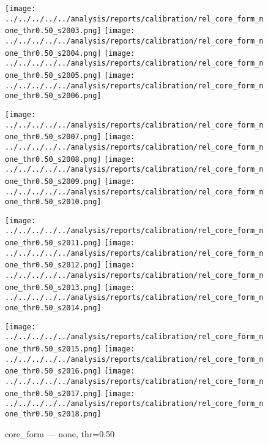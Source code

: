 \begin{figure}[t]
  \centering
  \begin{minipage}[t]{0.49\linewidth}
    \caption*{\footnotesize core_form — none, thr=0.50}
    \texttt{[image: ../../../../../analysis/reports/calibration/rel\_core\_form\_none\_thr0.50\_s2003.png]}
    \texttt{[image: ../../../../../analysis/reports/calibration/rel\_core\_form\_none\_thr0.50\_s2004.png]}
    \texttt{[image: ../../../../../analysis/reports/calibration/rel\_core\_form\_none\_thr0.50\_s2005.png]}
    \texttt{[image: ../../../../../analysis/reports/calibration/rel\_core\_form\_none\_thr0.50\_s2006.png]}
    \par\vspace{2pt}
    \texttt{[image: ../../../../../analysis/reports/calibration/rel\_core\_form\_none\_thr0.50\_s2007.png]}
    \texttt{[image: ../../../../../analysis/reports/calibration/rel\_core\_form\_none\_thr0.50\_s2008.png]}
    \texttt{[image: ../../../../../analysis/reports/calibration/rel\_core\_form\_none\_thr0.50\_s2009.png]}
    \texttt{[image: ../../../../../analysis/reports/calibration/rel\_core\_form\_none\_thr0.50\_s2010.png]}
    \par\vspace{2pt}
    \texttt{[image: ../../../../../analysis/reports/calibration/rel\_core\_form\_none\_thr0.50\_s2011.png]}
    \texttt{[image: ../../../../../analysis/reports/calibration/rel\_core\_form\_none\_thr0.50\_s2012.png]}
    \texttt{[image: ../../../../../analysis/reports/calibration/rel\_core\_form\_none\_thr0.50\_s2013.png]}
    \texttt{[image: ../../../../../analysis/reports/calibration/rel\_core\_form\_none\_thr0.50\_s2014.png]}
    \par\vspace{2pt}
    \texttt{[image: ../../../../../analysis/reports/calibration/rel\_core\_form\_none\_thr0.50\_s2015.png]}
    \texttt{[image: ../../../../../analysis/reports/calibration/rel\_core\_form\_none\_thr0.50\_s2016.png]}
    \texttt{[image: ../../../../../analysis/reports/calibration/rel\_core\_form\_none\_thr0.50\_s2017.png]}
    \texttt{[image: ../../../../../analysis/reports/calibration/rel\_core\_form\_none\_thr0.50\_s2018.png]}
    \par\vspace{2pt}

\end{minipage}
\end{figure}

